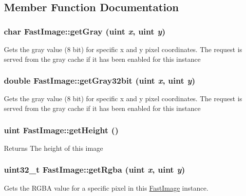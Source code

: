 \subsection{Member Function Documentation}
\hypertarget{class_fast_image_a7da37f6c5c99feea80c6a699c7b51bd8}{
\subsubsection[{getGray}]{\setlength{\rightskip}{0pt plus 5cm}char FastImage::getGray (uint {\em x}, \/  uint {\em y})}}
\label{class_fast_image_a7da37f6c5c99feea80c6a699c7b51bd8}
Gets the gray value (8 bit) for specific x and y pixel coordinates. The request is served from the gray cache if it has been enabled for this instance \hypertarget{class_fast_image_a6975ad540e89b98fda1b7a3bd3f812ea}{
\subsubsection[{getGray32bit}]{\setlength{\rightskip}{0pt plus 5cm}double FastImage::getGray32bit (uint {\em x}, \/  uint {\em y})}}
\label{class_fast_image_a6975ad540e89b98fda1b7a3bd3f812ea}
Gets the gray value (8 bit) for specific x and y pixel coordinates. The request is served from the gray cache if it has been enabled for this instance \hypertarget{class_fast_image_a1b90d63510575306ce345e393574d85c}{
\subsubsection[{getHeight}]{\setlength{\rightskip}{0pt plus 5cm}uint FastImage::getHeight ()}}
\label{class_fast_image_a1b90d63510575306ce345e393574d85c}
\begin{DoxyReturn}{Returns}
The height of this image 
\end{DoxyReturn}
\hypertarget{class_fast_image_a09e6df8ae76ddffb813048157f887ee6}{
\subsubsection[{getRgba}]{\setlength{\rightskip}{0pt plus 5cm}uint32\_\-t FastImage::getRgba (uint {\em x}, \/  uint {\em y})}}
\label{class_fast_image_a09e6df8ae76ddffb813048157f887ee6}
Gets the RGBA value for a specific pixel in this \hyperlink{class_fast_image}{FastImage} instance.

